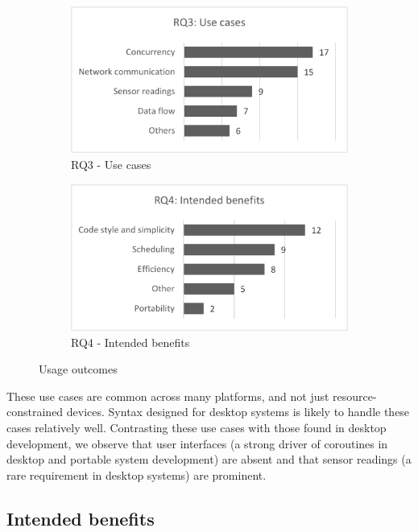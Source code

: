 \documentclass[format=acmsmall, review=false, screen=false]{acmart}
\begin{document}
\begin{figure}[h]
	\centering
	\begin{subfigure}[h]{0.46\textwidth}
		\centering
		\includegraphics[width=\textwidth]{RQ3-Use-cases}
		\caption{RQ3 - Use cases}
		\label{fig:rq3}
	\end{subfigure}
	\begin{subfigure}[h]{0.46\textwidth}
		\centering
		\includegraphics[width=\textwidth]{RQ4-Intended-benefits}
		\caption{RQ4 - Intended benefits}
		\label{fig:rq4}
	\end{subfigure}
	\caption{Usage outcomes}
\end{figure}

These use cases are common across many platforms, and not just resource-constrained devices. Syntax designed for desktop systems is likely to handle these cases relatively well. Contrasting these use cases with those found in desktop development, we observe that user interfaces (a strong driver of coroutines in desktop and portable system development) are absent and that sensor readings (a rare requirement in desktop systems) are prominent.

\subsection{Intended benefits}
\end{document}

